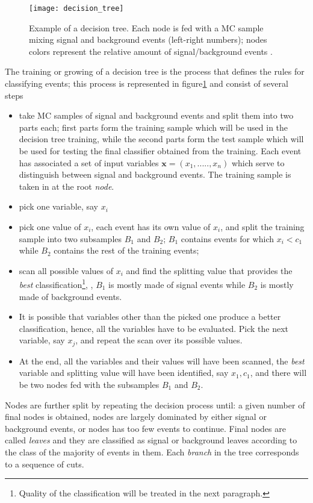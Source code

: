 \begin{figure}[!h]
  \centering
  \texttt{[image: decision\_tree]}
  \caption[Decision tree.]{Example of a decision tree. Each node is fed with a MC sample mixing signal and background events (left-right numbers); nodes colors represent the relative amount of signal/background events \cite{luca}.}\label{fig:dt}
\end{figure}

The training or growing of a decision tree is the process that defines the rules for classifying events; this process is represented in figure\ref{fig:dt} and consist of several steps

\begin{itemize}
\item take MC samples of signal and background events and split them into two parts each; first parts form the training sample which will be used in the decision tree training, while the second parts form the test sample which will be used for testing the final classifier obtained from the training. Each event has associated a set of input variables $\textbf{x}=(x_1,.....,x_n)$ which serve to distinguish between signal and background events. The training sample is taken in at the root \textit{node}. 
\item pick one variable, say $x_i$
\item pick one value of $x_i$, each event has its own value of $x_i$, and split the training sample into two subsamples $B_1$ and $B_2$; $B_1$ contains events for which $x_i< c_1$ while $B_2$ contains the rest of the training events;
\item scan all possible values of $x_i$ and find the splitting value that provides the \textit{best} classification\footnote{ Quality of the classification will be treated in the next paragraph.}, \ie, $B_1$ is mostly made of signal events while $B_2$ is mostly made of background events.
\item It is possible that variables other than the picked one produce a better classification, hence, all the variables have to be evaluated. Pick the next variable, say $x_j$, and repeat the scan over its possible values.
\item At the end, all the variables and their values will have been scanned, the \textit{best} variable and splitting value will have been identified, say $x_1, c_1$, and there will be two nodes fed with the subsamples $B_1$ and $B_2$. 
\end{itemize}

Nodes are further split by repeating the decision process until: a given number of final nodes is obtained, nodes are largely dominated by either signal or background events, or nodes has too few events to continue. Final nodes are called \textit{leaves} and they are classified as signal or background leaves according to the class of the majority of events in them. Each \textit{branch} in the tree corresponds to a sequence of cuts. 

